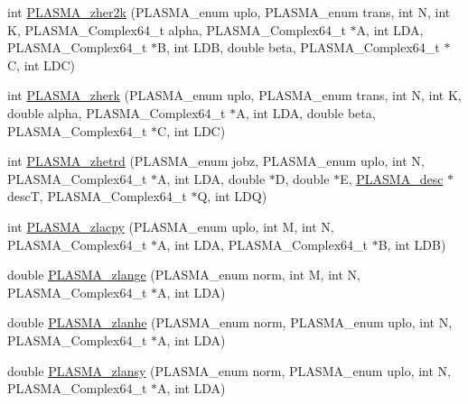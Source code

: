 \begin{DoxyCompactItemize}
\item 
int \hyperlink{group__PLASMA__Complex64__t_ga1086284f7bd6db0de2341eeaa3a3e655_ga1086284f7bd6db0de2341eeaa3a3e655}{P\+L\+A\+S\+M\+A\+\_\+zher2k} (P\+L\+A\+S\+M\+A\+\_\+enum uplo, P\+L\+A\+S\+M\+A\+\_\+enum trans, int N, int K, P\+L\+A\+S\+M\+A\+\_\+\+Complex64\+\_\+t alpha, P\+L\+A\+S\+M\+A\+\_\+\+Complex64\+\_\+t $\ast$A, int L\+D\+A, P\+L\+A\+S\+M\+A\+\_\+\+Complex64\+\_\+t $\ast$B, int L\+D\+B, double beta, P\+L\+A\+S\+M\+A\+\_\+\+Complex64\+\_\+t $\ast$C, int L\+D\+C)
\item 
int \hyperlink{group__PLASMA__Complex64__t_ga37897923ff4fb613bbd5a69a58b12fb8_ga37897923ff4fb613bbd5a69a58b12fb8}{P\+L\+A\+S\+M\+A\+\_\+zherk} (P\+L\+A\+S\+M\+A\+\_\+enum uplo, P\+L\+A\+S\+M\+A\+\_\+enum trans, int N, int K, double alpha, P\+L\+A\+S\+M\+A\+\_\+\+Complex64\+\_\+t $\ast$A, int L\+D\+A, double beta, P\+L\+A\+S\+M\+A\+\_\+\+Complex64\+\_\+t $\ast$C, int L\+D\+C)
\item 
int \hyperlink{group__PLASMA__Complex64__t_gadeaa16b417f2033a10685c130db081fb_gadeaa16b417f2033a10685c130db081fb}{P\+L\+A\+S\+M\+A\+\_\+zhetrd} (P\+L\+A\+S\+M\+A\+\_\+enum jobz, P\+L\+A\+S\+M\+A\+\_\+enum uplo, int N, P\+L\+A\+S\+M\+A\+\_\+\+Complex64\+\_\+t $\ast$A, int L\+D\+A, double $\ast$D, double $\ast$E, \hyperlink{structplasma__desc__t}{P\+L\+A\+S\+M\+A\+\_\+desc} $\ast$desc\+T, P\+L\+A\+S\+M\+A\+\_\+\+Complex64\+\_\+t $\ast$Q, int L\+D\+Q)
\item 
int \hyperlink{group__PLASMA__Complex64__t_ga8502c982b63153d2a7c11c05fe51cd39_ga8502c982b63153d2a7c11c05fe51cd39}{P\+L\+A\+S\+M\+A\+\_\+zlacpy} (P\+L\+A\+S\+M\+A\+\_\+enum uplo, int M, int N, P\+L\+A\+S\+M\+A\+\_\+\+Complex64\+\_\+t $\ast$A, int L\+D\+A, P\+L\+A\+S\+M\+A\+\_\+\+Complex64\+\_\+t $\ast$B, int L\+D\+B)
\item 
double \hyperlink{group__PLASMA__Complex64__t_ga0a59419c4731f28c9d8ff470d23d5db3_ga0a59419c4731f28c9d8ff470d23d5db3}{P\+L\+A\+S\+M\+A\+\_\+zlange} (P\+L\+A\+S\+M\+A\+\_\+enum norm, int M, int N, P\+L\+A\+S\+M\+A\+\_\+\+Complex64\+\_\+t $\ast$A, int L\+D\+A)
\item 
double \hyperlink{group__PLASMA__Complex64__t_ga58656cfce8c3d31d5efcf3e987e33e64_ga58656cfce8c3d31d5efcf3e987e33e64}{P\+L\+A\+S\+M\+A\+\_\+zlanhe} (P\+L\+A\+S\+M\+A\+\_\+enum norm, P\+L\+A\+S\+M\+A\+\_\+enum uplo, int N, P\+L\+A\+S\+M\+A\+\_\+\+Complex64\+\_\+t $\ast$A, int L\+D\+A)
\item 
double \hyperlink{group__PLASMA__Complex64__t_ga2e163a7890571e447804ed020a4c05b5_ga2e163a7890571e447804ed020a4c05b5}{P\+L\+A\+S\+M\+A\+\_\+zlansy} (P\+L\+A\+S\+M\+A\+\_\+enum norm, P\+L\+A\+S\+M\+A\+\_\+enum uplo, int N, P\+L\+A\+S\+M\+A\+\_\+\+Complex64\+\_\+t $\ast$A, int L\+D\+A)

\end{DoxyCompactItemize}
